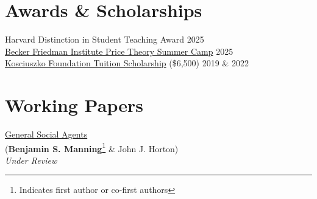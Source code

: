 \documentclass[margin,line,pifont,palatino,courier, 9pt]{res}
\begin{document}
\begin{resume}
\section{\sc Awards \& Scholarships}
Harvard Distinction in Student Teaching Award \hfill 2025 \\
\href{https://bfi.uchicago.edu/events/event/2025-price-theory-summer-camp/}{Becker Friedman Institute Price Theory Summer Camp} \hfill 2025 \\
\href{https://thekf.org/scholarship/tuition-scholarships/tuition-scholarships-for-graduate-studies/}{Kosciuszko Foundation Tuition Scholarship} (\$6,500) \hfill 2019 \& 2022 




\section{\sc Working Papers}

\href{https://benjaminmanning.io/files/optimize.pdf}{General Social Agents}\\
(\textbf{Benjamin S. Manning}\footnote{Indicates first author or co-first authors} \& John J. Horton)\\
\textit{Under Review}



\end{resume}
\end{document}
